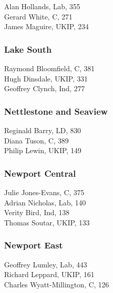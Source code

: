 \documentclass[a4paper,openany,10pt]{book}
\begin{document}


Alan Hollands, Lab, 355\\
Gerard White, C, 271\\
James Maguire, UKIP, 234\\


\subsubsection*{Lake South}



Raymond Bloomfield, C, 381\\
Hugh Dinsdale, UKIP, 331\\
Geoffrey Clynch, Ind, 277\\


\subsubsection*{Nettlestone and Seaview}



Reginald Barry, LD, 830\\
Diana Tuson, C, 389\\
Philip Lewin, UKIP, 149\\


\subsubsection*{Newport Central}



Julie Jones-Evans, C, 375\\
Adrian Nicholas, Lab, 140\\
Verity Bird, Ind, 138\\
Thomas Soutar, UKIP, 133\\


\subsubsection*{Newport East}



Geoffrey Lumley, Lab, 443\\
Richard Leppard, UKIP, 161\\
{Charles Wyatt-Millington}, C, 126\\
\end{document}
